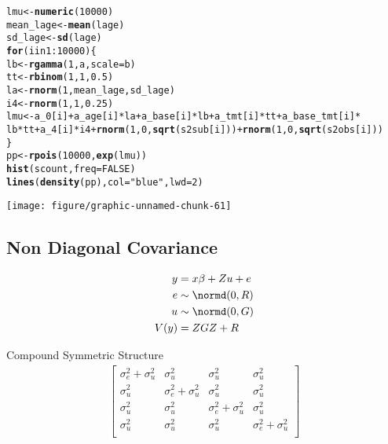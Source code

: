 \documentclass[12pt,letterpaper,oneside]{article}\usepackage{graphicx, color}
\makeatletter
\newcommand{\hlfunctioncall}[1]{\textcolor[rgb]{0.501960784313725,0,0.329411764705882}{\textbf{#1}}}%
\newcommand{\hlstring}[1]{\textcolor[rgb]{0.6,0.6,1}{#1}}%
\newenvironment{kframe}{%
 \def\at@end@of@kframe{}%
 \ifinner\ifhmode%
  \def\at@end@of@kframe{\end{minipage}}%
  \begin{minipage}{\columnwidth}%
 \fi\fi%
 \def\FrameCommand##1{\hskip\@totalleftmargin \hskip-\fboxsep
 \colorbox{shadecolor}{##1}\hskip-\fboxsep
     \hskip-\linewidth \hskip-\@totalleftmargin \hskip\columnwidth}%
 \MakeFramed {\advance\hsize-\width
   \@totalleftmargin\z@ \linewidth\hsize
   \@setminipage}}%
 {\par\unskip\endMakeFramed%
 \at@end@of@kframe}
\newenvironment{knitrout}{}{} %
\makeatother
\begin{document}
\begin{knitrout}\scriptsize
{}\color{fgcolor}\begin{kframe}
\begin{alltt}
lmu <- \hlfunctioncall{numeric}(10000)
mean_lage <- \hlfunctioncall{mean}(lage)
sd_lage <- \hlfunctioncall{sd}(lage)
\hlfunctioncall{for} (i in 1:10000) \{
    lb <- \hlfunctioncall{rgamma}(1, a, scale = b)
    tt <- \hlfunctioncall{rbinom}(1, 1, 0.5)
    la <- \hlfunctioncall{rnorm}(1, mean_lage, sd_lage)
    i4 <- \hlfunctioncall{rnorm}(1, 1, 0.25)
    lmu <- a_0[i] + a_age[i] * la + a_base[i] * lb + a_tmt[i] * tt + a_base_tmt[i] * 
        lb * tt + a_4[i] * i4 + \hlfunctioncall{rnorm}(1, 0, \hlfunctioncall{sqrt}(s2sub[i])) + \hlfunctioncall{rnorm}(1, 0, \hlfunctioncall{sqrt}(s2obs[i]))
\}
pp <- \hlfunctioncall{rpois}(10000, \hlfunctioncall{exp}(lmu))
\hlfunctioncall{hist}(scount, freq = FALSE)
\hlfunctioncall{lines}(\hlfunctioncall{density}(pp), col = \hlstring{"blue"}, lwd = 2)
\end{alltt}
\end{kframe}

{\centering \texttt{[image: figure/graphic-unnamed-chunk-61]} 

}



\end{knitrout}

\subsection{Non Diagonal Covariance} %
\label{sub:non_diagonal_covariance}
\begin{align*}
    y &= x \beta + Z u + e\\
    e &\sim \normd(0,R)\\
    u &\sim \normd(0,G)\\
    V(y) &= ZGZ + R
\end{align*}

Compound Symmetric Structure
\begin{align*}
    \begin{bmatrix}
        \sigma^{2}_{e} + \sigma^{2}_{u} & \sigma^{2}_{u} & \sigma^{2}_{u} & \sigma^{2}_{u}\\
        \sigma^{2}_{u} & \sigma^{2}_{e} + \sigma^{2}_{u} & \sigma^{2}_{u} & \sigma^{2}_{u}\\
        \sigma^{2}_{u} & \sigma^{2}_{u} & \sigma^{2}_{e} + \sigma^{2}_{u} & \sigma^{2}_{u}\\
        \sigma^{2}_{u} & \sigma^{2}_{u} & \sigma^{2}_{u} & \sigma^{2}_{e} + \sigma^{2}_{u}\\
    \end{bmatrix}
\end{align*}
\end{document}
